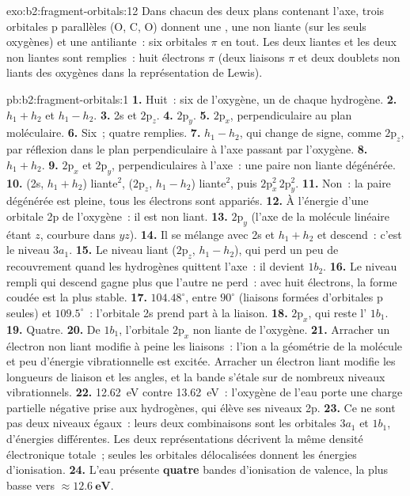 \begin{solution}{exo:b2:fragment-orbitals:12}
Dans chacun des deux plans contenant l'axe, trois orbitales p parallèles (O, C, O)
donnent une , une non liante (sur les seuls oxygènes) et une antiliante~: six
orbitales $\pi$ en tout. Les deux liantes et les deux non liantes sont remplies~: huit
électrons $\pi$ (deux liaisons $\pi$ et deux doublets non liants des oxygènes dans la représentation de Lewis).
\end{solution}

\begin{solution}{pb:b2:fragment-orbitals:1}
\textbf{1.} Huit~: six de l'oxygène, un de chaque hydrogène.
\textbf{2.} $h_1 + h_2$ et $h_1 - h_2$.
\textbf{3.} 2s et $2\mathrm p_z$.
\textbf{4.} $2\mathrm p_y$.
\textbf{5.} $2\mathrm p_x$, perpendiculaire au plan moléculaire.
\textbf{6.} Six~; quatre remplies.
\textbf{7.} $h_1 - h_2$, qui change de signe, comme $2\mathrm p_z$, par réflexion dans le plan
perpendiculaire à l'axe passant par l'oxygène.
\textbf{8.} $h_1 + h_2$.
\textbf{9.} $2\mathrm p_x$ et $2\mathrm p_y$, perpendiculaires à l'axe~: une paire non liante
dégénérée.
\textbf{10.} (2s, $h_1 + h_2$) liante$^2$, ($2\mathrm p_z$, $h_1 - h_2$) liante$^2$, puis
$2\mathrm p_x^2\,2\mathrm p_y^2$.
\textbf{11.} Non~: la paire dégénérée est pleine, tous les électrons sont appariés.
\textbf{12.} À l'énergie d'une orbitale 2p de l'oxygène~: il est non liant.
\textbf{13.} $2\mathrm p_y$ (l'axe de la molécule linéaire étant $z$, courbure dans $yz$).
\textbf{14.} Il se mélange avec 2s et $h_1 + h_2$ et descend~: c'est le niveau $3a_1$.
\textbf{15.} Le niveau liant ($2\mathrm p_z$, $h_1 - h_2$), qui perd un peu de recouvrement quand les
hydrogènes quittent l'axe~: il devient $1b_2$.
\textbf{16.} Le niveau rempli qui descend gagne plus que l'autre ne perd~: avec huit
électrons, la forme coudée est la plus stable.
\textbf{17.} $104.48^\circ$, entre $90^\circ$ (liaisons formées d'orbitales p seules) et $109.5^\circ$~:
l'orbitale 2s prend part à la liaison.
\textbf{18.} $2\mathrm p_x$, qui reste l' $1b_1$.
\textbf{19.} Quatre.
\textbf{20.} De $1b_1$, l'orbitale $2\mathrm p_x$ non liante de l'oxygène.
\textbf{21.} Arracher un électron non liant modifie à peine les liaisons~: l'ion a la
géométrie de la molécule et peu d'énergie vibrationnelle est excitée. Arracher un
électron liant modifie les longueurs de liaison et les angles, et la bande s'étale sur
de nombreux niveaux vibrationnels.
\textbf{22.} \qty{12.62}{eV} contre \qty{13.62}{eV}~: l'oxygène de l'eau porte une charge partielle
négative prise aux hydrogènes, qui élève ses niveaux 2p.
\textbf{23.} Ce ne sont pas deux niveaux égaux~: leurs deux combinaisons sont les orbitales $3a_1$ et
$1b_1$, d'énergies différentes. Les deux représentations décrivent la même densité électronique
totale~; seules les orbitales délocalisées donnent les énergies d'ionisation.
\textbf{24.} L'eau présente \textbf{quatre} bandes d'ionisation de valence, la plus basse vers
$\boldsymbol{\approx \qty{12.6}{eV}}$.
\end{solution}
